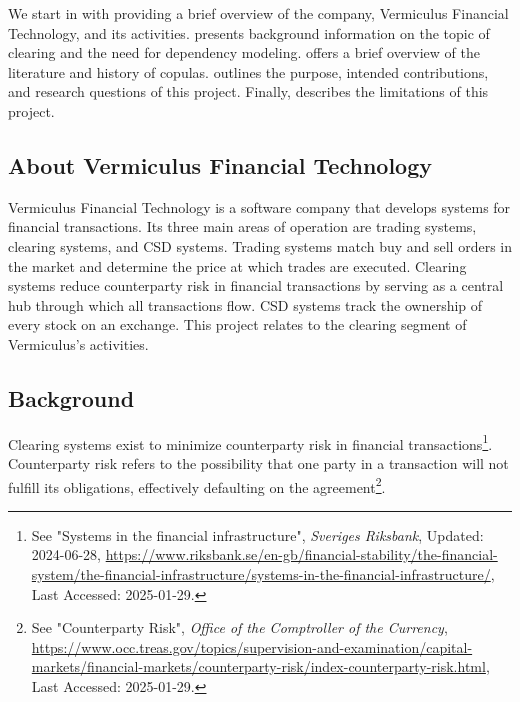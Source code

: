 We start in  with providing a brief overview of the company, Vermiculus Financial Technology, and its activities.  presents background information on the topic of clearing and the need for dependency modeling.  offers a brief overview of the literature and history of copulas.  outlines the purpose, intended contributions, and research questions of this project. Finally,  describes the limitations of this project.

\subsection{About Vermiculus Financial Technology} \label{AboutVFT}
Vermiculus Financial Technology is a software company that develops systems for financial transactions. Its three main areas of operation are trading systems, clearing systems, and \gls{CSD} systems. Trading systems match buy and sell orders in the market and determine the price at which trades are executed. Clearing systems reduce counterparty risk in financial transactions by serving as a central hub through which all transactions flow. \gls{CSD} systems track the ownership of every stock on an exchange. This project relates to the clearing segment of Vermiculus’s activities.

\subsection{Background}\label{Background}
Clearing systems exist to minimize counterparty risk in financial transactions\footnote{See "Systems in the financial infrastructure", \textit{Sveriges Riksbank}, Updated: 2024-06-28, \url{https://www.riksbank.se/en-gb/financial-stability/the-financial-system/the-financial-infrastructure/systems-in-the-financial-infrastructure/}, Last Accessed: 2025-01-29.}. Counterparty risk refers to the possibility that one party in a transaction will not fulfill its obligations, effectively defaulting on the agreement\footnote{See "Counterparty Risk", \textit{Office of the Comptroller of the Currency}, \url{https://www.occ.treas.gov/topics/supervision-and-examination/capital-markets/financial-markets/counterparty-risk/index-counterparty-risk.html}, Last Accessed: 2025-01-29.}.



